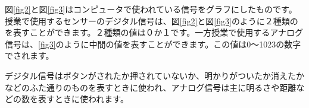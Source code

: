 図\ref{fig2}と図\ref{fig3}はコンピュータで使われている信号をグラフにしたものです。授業で使用するセンサーのデジタル信号は、図\ref{fig2}と図\ref{fig3}のように２種類のを表すことができます。２種類の値は０か１です。一方授業で使用するアナログ信号は、\ref{fig3}のように中間の値を表すことができます。この値は0〜1023の数字でされます。

デジタル信号はボタンがされたか押されていないか、明かりがついたか消えたかなどのふた通りのものを表すときに使われ、アナログ信号は主に明るさや距離などの数を表すときに使われます。

\begin{tcolorbox}[title=\useOmetoi]
\begin{enumerate}
\end{enumerate}
\end{tcolorbox}
